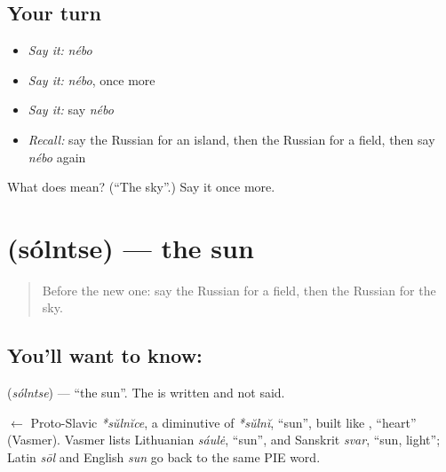 \subsection*{Your turn}
\begin{itemize}
\raggedright
  \item \emph{Say it:} \emph{nébo}
  \item \emph{Say it:} \emph{nébo}, once more
  \item \emph{Say it:} say \emph{nébo}
  \item \emph{Recall:} say the Russian for an island, then the Russian for a field, then say \emph{nébo} again
\end{itemize}

\begin{tcolorbox}[breakable,colback=teal!4,colframe=teal!35!black,title={Before you move on}]
What does  mean? (\textquotedblleft{}The sky\textquotedblright{}.) Say it once more.
\end{tcolorbox}
\section[\texorpdfstring{\ru{солнце} (sólntse)}{солнце (sólntse)}]{ (sólntse) — the sun}

\label{lesson:RU-C58-sun}



\begin{quote}
Before the new one: say the Russian for a field, then the Russian for the sky.
\end{quote}

\subsection*{You'll want to know: }
\textbf{} (\emph{sólntse}) — \textquotedblleft{}the sun\textquotedblright{}. The \textbf{} is written and not said.

\begin{cousinweb}
\textbf{} $\leftarrow$ Proto-Slavic \emph{*sŭlnĭce}, a diminutive of \emph{*sŭlnĭ}, \textquotedblleft{}sun\textquotedblright{}, built like \emph{}, \textquotedblleft{}heart\textquotedblright{} (Vasmer). Vasmer lists Lithuanian \emph{sáulė}, \textquotedblleft{}sun\textquotedblright{}, and Sanskrit \emph{svar}, \textquotedblleft{}sun, light\textquotedblright{}; Latin \emph{sōl} and English \emph{sun} go back to the same PIE word.
\end{cousinweb}

